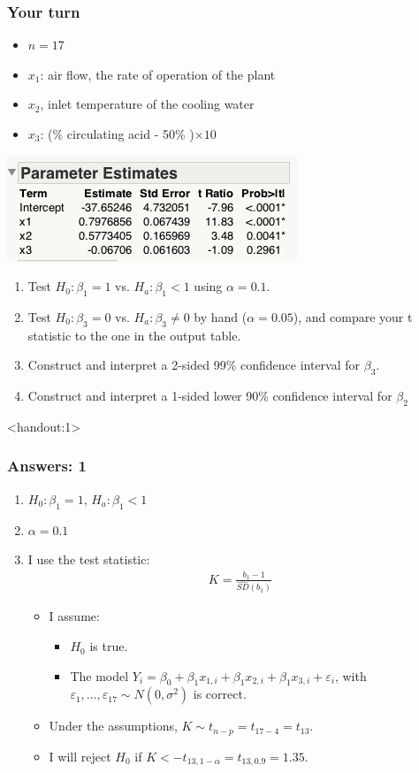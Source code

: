 \documentclass[handout]{beamer}\usepackage{graphicx, color}
\newcommand{\answers}{1}
\providecommand{\e}{\varepsilon}
\providecommand{\wh}[1]{\widehat{#1}}
\numberwithin{equation}{section}
\begin{document}
\begin{frame}
\frametitle{Your turn} \scriptsize
\begin{itemize}
\item $n = 17$
\item $x_1$: air flow, the rate of operation of the plant
\pause \item $x_2$, inlet temperature of the cooling water
\pause \item $x_3$: (\% circulating acid - 50\% )$\times 10$
\end{itemize}
\begin{center}
 \includegraphics{../../fig/stackparams.png}
\end{center}
\begin{enumerate}[1. ]
\pause \item Test $H_0: \beta_1 = 1$ vs. $H_a: \beta_1 < 1$ using $\alpha = 0.1$. 
\pause \item Test $H_0: \beta_3 = 0$ vs. $H_a: \beta_3 \ne 0$ by hand ($\alpha = 0.05$), and compare your t statistic to the one in the output table.
\pause \item Construct and interpret a 2-sided 99\% confidence interval for $\beta_3$. 
\pause \item Construct and interpret a 1-sided lower 90\% confidence interval for $\beta_2$
\end{enumerate}
\end{frame}

\begin{frame}<handout:\answers>
\frametitle{Answers: 1}
\begin{enumerate}[1. ]
\item $H_0: \beta_1 = 1$, $H_a: \beta_1 < 1$
\pause \item $\alpha = 0.1$
\pause \item I use the test statistic:
\pause \begin{align*}
K = \frac{b_1 - 1}{\wh{SD}(b_1)}
\end{align*}
\begin{itemize}
\pause \item I assume:
\begin{itemize}
\pause \item $H_0$ is true.
\pause \item The model $Y_i = \beta_0 + \beta_1 x_{1, i} + \beta_1 x_{2, i} + \beta_1 x_{3, i} + \e_i$, with $\e_1, \ldots, \e_{17} \sim N(0, \sigma^2)$ is correct.
\end{itemize}
\pause \item Under the assumptions, $K \sim t_{n - p} = t_{17 - 4} = t_{13}$.
\pause \item I will reject $H_0$ if $K< -t_{13, 1 - \alpha} = t_{13, 0.9} = 1.35$.
\end{itemize}
\end{enumerate}
\end{frame}
\end{document}
